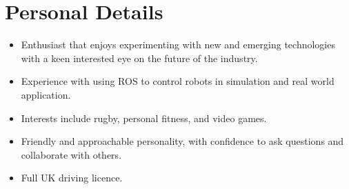\documentclass[10pt]{article}
\begin{document}
\section*{Personal Details}
\begin{itemize}[noitemsep,topsep=0pt]
    \item Enthusiast that enjoys experimenting with new and emerging technologies with a keen interested eye on the future of the industry.
    \item Experience with using ROS to control robots in simulation and real world application.
	\item Interests include rugby, personal fitness, and video games.
	\item Friendly and approachable personality, with confidence to ask questions and collaborate with others.
	\item Full UK driving licence.
\end{itemize}
\end{document}

